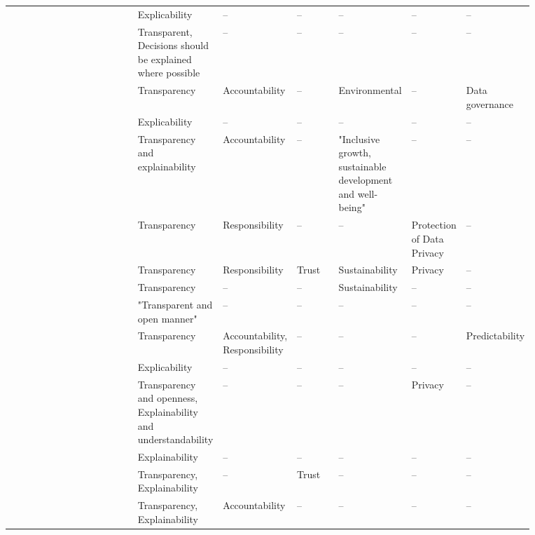 \begin{landscape}
\begin{ThreePartTable}
\begin{longtable}{P{0.25\linewidth}P{0.12\linewidth}P{0.12\linewidth}P{0.08\linewidth}P{0.1\linewidth}P{0.1\linewidth}P{0.1\linewidth}}
        \textcite{Morley_2021} & Explicability & -- & -- & -- & -- & -- \\ 
        \textcite{Nauck_2019} & Transparent, \mbox{Decisions} should be explained where \mbox{possible} & -- & -- & -- & -- & -- \\ 
        \textcite{Papagiannidis_2022} & Transparency & Accountability & -- & Environmental & -- & Data governance \\ 
        \textcite{Peters_2020} & Explicability & -- & -- & -- & -- & -- \\ 
        \textcite{Rizinski_2022} & Transparency and explainability & Accountability & -- & "Inclusive growth, sustainable \mbox{development} and well-being" & -- & -- \\ 
        \textcite{Rothenberger_2019} & Transparency & Responsibility & -- & -- & Protection of Data Privacy & -- \\ 
        \textcite{Ryan_2021} & Transparency & Responsibility & Trust & Sustainability & Privacy & -- \\ 
        \textcite{Siala_2022} & Transparency & -- & -- & Sustainability & -- & -- \\ 
        \textcite{Thelisson_2018} & "Transparent and open manner" & -- & -- & -- & -- & -- \\ 
        \textcite{Vakkuri_2022} & Transparency & Accountability, \mbox{Responsibility} & -- & -- & -- & Predictability \\ 
        \textcite{vanBruxvoort_2021} & Explicability & -- & -- & -- & -- & -- \\ 
        \textcite{Vetro_2019} & Transparency and openness, \mbox{Explainability} and understandability & -- & -- & -- & Privacy & -- \\  
        \textcite{WangW_2021} & Explainability & -- & -- & -- & -- & -- \\ 
        \textcite{WangY_2020} & Transparency, \mbox{Explainability} & -- & Trust & -- & -- & -- \\
        \textcite{Werder_2022} & Transparency, \mbox{Explainability} & Accountability & -- & -- & -- & -- \\ 


\end{longtable}
\end{ThreePartTable}
\end{landscape}
